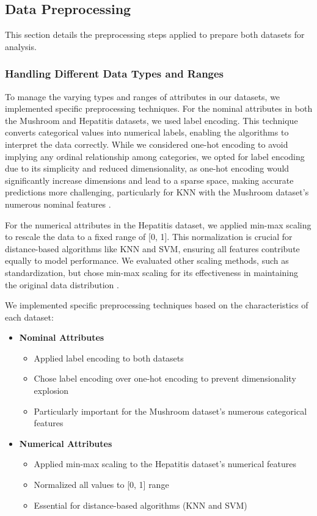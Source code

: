 \subsection{Data Preprocessing}
\label{subsec:preprocessing}

This section details the preprocessing steps applied to prepare both datasets for analysis.

\subsubsection{Handling Different Data Types and Ranges}To manage the varying types and ranges of attributes in our datasets, we implemented specific preprocessing techniques.
For the nominal attributes in both the Mushroom and Hepatitis datasets, we used label encoding.
This technique converts categorical values into numerical labels, enabling the algorithms to interpret the data correctly.
While we considered one-hot encoding to avoid implying any ordinal relationship among categories, we opted for label
encoding due to its simplicity and reduced dimensionality, as one-hot encoding would significantly increase
dimensions and lead to a sparse space, making accurate predictions more challenging, particularly for KNN with 
the Mushroom dataset's numerous nominal features \cite{data_preprocess}.

For the numerical attributes in the Hepatitis dataset, we applied min-max scaling to rescale the data to a fixed range of [0, 1]. This normalization is crucial for distance-based algorithms like KNN and SVM, ensuring all features contribute equally to model performance.
We evaluated other scaling methods, such as standardization, but chose min-max scaling for its effectiveness in maintaining the original data distribution \cite{data_cleaning}.

We implemented specific preprocessing techniques based on the characteristics of each dataset:

\begin{itemize}
    \item \textbf{Nominal Attributes}
    \begin{itemize}
        \item Applied label encoding to both datasets
        \item Chose label encoding over one-hot encoding to prevent dimensionality explosion
        \item Particularly important for the Mushroom dataset's numerous categorical features
    \end{itemize}
    
    \item \textbf{Numerical Attributes}
    \begin{itemize}
        \item Applied min-max scaling to the Hepatitis dataset's numerical features
        \item Normalized all values to [0, 1] range
        \item Essential for distance-based algorithms (KNN and SVM)
    \end{itemize}
\end{itemize}

